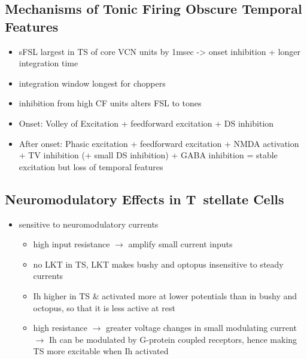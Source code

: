 \subsection{Mechanisms of Tonic Firing Obscure Temporal Features}


\begin{itemize}
\item sFSL largest in TS of core VCN units by 1msec -> onset inhibition + longer integration time \citep{GisbergenGrashuisEtAl:1975,GisbergenGrashuisEtAl:1975a,GisbergenGrashuisEtAl:1975b,YoungRobertEtAl:1988,PaoliniClareyEtAl:2004}
\item integration window longest for choppers \citep{McGinleyOertel:2006}
\item inhibition from high CF units alters FSL to tones \citep{Wickesberg:1996}
\item Onset: Volley of Excitation + feedforward excitation + DS inhibition
\item After onset: Phasic excitation + feedforward excitation + NMDA activation + TV inhibition (+ small DS inhibition) + GABA inhibition = stable excitation but loss of temporal features
\end{itemize}

\subsection{Neuromodulatory Effects in T~stellate Cells}

\begin{itemize}
\item sensitive to neuromodulatory currents \citep{FujinoOertel:2001}
\begin{itemize}
\item high input resistance $\rightarrow$ amplify small current inputs \citep{FujinoOertel:2001}
\item no LKT in TS,  LKT makes bushy and optopus insensitive to steady currents \citep{OertelFujino:2001,McGinleyOertel:2006}
\item Ih higher in TS \& activated more at lower potentials than in bushy and octopus, so that it is less active at rest
\item high resistance $\rightarrow$ greater voltage changes in small modulating current $\rightarrow$ Ih can be modulated by G-protein coupled receptors, hence making TS more excitable when Ih activated \citep{RodriguesOertel:2006}
\end{itemize}
\end{itemize}

